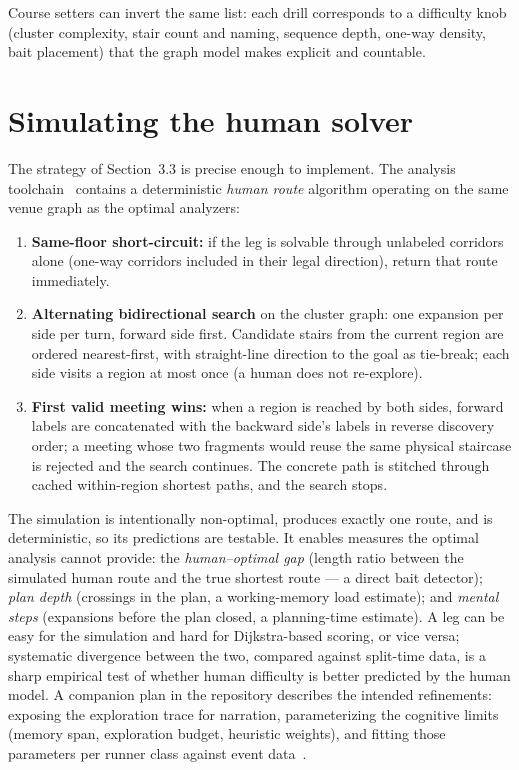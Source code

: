 \documentclass[11pt,a4paper,twocolumn]{article}
\begin{document}
Course setters can invert the same list: each drill corresponds to a
difficulty knob (cluster complexity, stair count and naming, sequence depth,
one-way density, bait placement) that the graph model makes explicit and
countable.

\section{Simulating the human solver}
\label{sec:simulation}

The strategy of Section~3.3 is precise enough to implement. The analysis
toolchain~\cite{repo} contains a deterministic \emph{human route} algorithm
operating on the same venue graph as the optimal analyzers:

\begin{enumerate}
    \item \textbf{Same-floor short-circuit:} if the leg is solvable through
          unlabeled corridors alone (one-way corridors included in their
          legal direction), return that route immediately.
    \item \textbf{Alternating bidirectional search} on the cluster graph:
          one expansion per side per turn, forward side first. Candidate
          stairs from the current region are ordered nearest-first, with
          straight-line direction to the goal as tie-break; each side visits
          a region at most once (a human does not re-explore).
    \item \textbf{First valid meeting wins:} when a region is reached by
          both sides, forward labels are concatenated with the backward
          side's labels in reverse discovery order; a meeting whose two
          fragments would reuse the same physical staircase is rejected and
          the search continues. The concrete path is stitched through
          cached within-region shortest paths, and the search stops.
\end{enumerate}

The simulation is intentionally non-optimal, produces exactly one route, and
is deterministic, so its predictions are testable. It enables measures the
optimal analysis cannot provide: the \emph{human--optimal gap} (length ratio
between the simulated human route and the true shortest route --- a direct
bait detector); \emph{plan depth} (crossings in the plan, a working-memory
load estimate); and \emph{mental steps} (expansions before the plan closed, a
planning-time estimate). A leg can be easy for the simulation and hard for
Dijkstra-based scoring, or vice versa; systematic divergence between the two,
compared against split-time data, is a sharp empirical test of whether human
difficulty is better predicted by the human model. A companion plan in the
repository describes the intended refinements: exposing the exploration
trace for narration, parameterizing the cognitive limits (memory span,
exploration budget, heuristic weights), and fitting those parameters per
runner class against event data~\cite{repo}.
\end{document}
